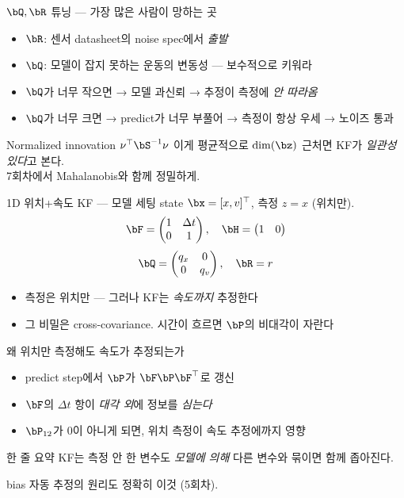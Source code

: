 \begin{frame}{$\bQ, \bR$ 튜닝 — 가장 많은 사람이 망하는 곳}
  \begin{itemize}
    \item $\bR$: 센서 datasheet의 noise spec에서 \emph{출발}
    \item $\bQ$: 모델이 잡지 못하는 운동의 변동성 — 보수적으로 키워라
    \item $\bQ$가 너무 작으면 → 모델 과신뢰 → 추정이 측정에 \emph{안 따라옴}
    \item $\bQ$가 너무 크면 → predict가 너무 부풀어 → 측정이 항상 우세 → 노이즈 통과
  \end{itemize}
  \pause
  \vspace{0.3em}
  \begin{block}{Normalized innovation $\nu^\top \bS^{-1} \nu$}
    이게 평균적으로 $\dim(\bz)$ 근처면 KF가 \emph{일관성 있다}고 본다. \\
    7회차에서 Mahalanobis와 함께 정밀하게.
  \end{block}
\end{frame}

\begin{frame}{1D 위치+속도 KF — 모델 세팅}
  state $\bx = [x, v]^\top$, 측정 $z = x$ (위치만).
  \[
    \bF = \begin{pmatrix} 1 & \Delta t \\ 0 & 1 \end{pmatrix}, \quad
    \bH = \begin{pmatrix} 1 & 0 \end{pmatrix}
  \]
  \[
    \bQ = \begin{pmatrix} q_x & 0 \\ 0 & q_v \end{pmatrix}, \quad \bR = r
  \]
  \pause
  \vspace{0.3em}
  \begin{itemize}
    \item 측정은 위치만 — 그러나 KF는 \emph{속도까지} 추정한다
    \item 그 비밀은 cross-covariance. 시간이 흐르면 $\bP$의 비대각이 자란다
  \end{itemize}
\end{frame}

\begin{frame}{왜 위치만 측정해도 속도가 추정되는가}
  \begin{itemize}
    \item predict step에서 $\bP$가 $\bF\bP\bF^\top$로 갱신
    \item $\bF$의 $\Delta t$ 항이 \emph{대각 외}에 정보를 \emph{심는다}
    \item $\bP_{12}$가 0이 아니게 되면, 위치 측정이 속도 추정에까지 영향
  \end{itemize}
  \pause
  \vspace{0.3em}
  \begin{block}{한 줄 요약}
    KF는 측정 안 한 변수도 \emph{모델에 의해} 다른 변수와 묶이면 함께 좁아진다.
  \end{block}
  bias 자동 추정의 원리도 정확히 이것 (5회차).
\end{frame}

